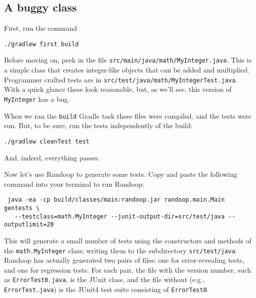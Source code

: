 \documentclass[11pt, oneside]{article} %
\newcommand{\code}[1]{{\texttt{#1}}}
\newcommand{\cmd}[1]{{\texttt{#1}}}
\begin{document}
\subsection{A buggy class}
First, run the command
\begin{verbatim}
./gradlew first build
\end{verbatim}

Before moving on, peek in the file \texttt{src/main/java/math/MyInteger.java}.
This is a simple class that creates integer-like objects that can be added and multiplied.
Programmer crafted tests are in \texttt{src/test/java/math/MyIntegerTest.java}.
With a quick glance these look reasonable, but, as we'll see, this version of \code{MyInteger} has a bug.

When we ran the \cmd{build} Gradle task these files were compiled, and the tests were run.
But, to be sure, run the tests independently of the build:
\begin{verbatim}
./gradlew cleanTest test
\end{verbatim}
And, indeed, everything passes.

Now let's use Randoop to generate some tests.
Copy and paste the following command into your terminal to run Randoop:
\begin{verbatim}
 java -ea -cp build/classes/main:randoop.jar randoop.main.Main gentests \
   --testclass=math.MyInteger --junit-output-dir=src/test/java --outputlimit=20
\end{verbatim}
This will generate a small number of tests using the constructors and methods of the \texttt{math.MyInteger} class; writing them to the subdirectory \texttt{src/test/java}.
Randoop has actually generated two pairs of files: one for error-revealing tests, and one for regression tests.
For each pair, the file with the version number, such as \texttt{ErrorTest0.java}, is the JUnit class, and the file without (e.g., \texttt{ErrorTest.java}) is the JUnit4 test suite consisting of \code{ErrorTest0}.
\end{document}
